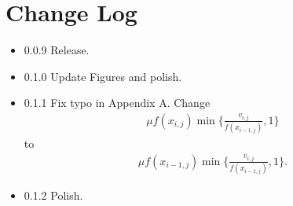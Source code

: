 \section{Change Log}
\begin{itemize}
\item{0.0.9} Release.
\item{0.1.0} Update Figures and polish.
\item{0.1.1} Fix typo in Appendix A. Change 
\begin{align*}
\mu f(x_{i,j}) \min\{\frac{v_{i,j}}{f(x_{i-1,j})},1\}
\end{align*}
\noindent to 
\begin{align*}
\mu f(x_{i-1,j}) \min\{\frac{v_{i,j}}{f(x_{i-1,j})},1\}.
\end{align*}
\item{0.1.2} Polish. 
\end{itemize}
